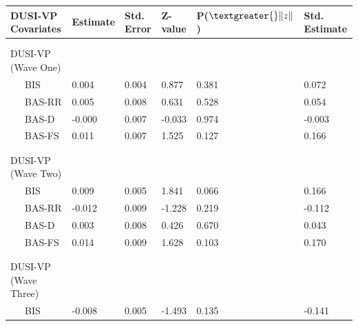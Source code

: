 \documentclass[utf8]{article}
\begin{document}
\begin{table}[h!]
\begin{tabular}{llllll}
DUSI-VP Covariates                    & Estimate & Std. Error & Z-value & P($\textgreater{}\|z\|$) & Std. Estimate \\ \hline \\
                               &          &            &         &                          &         \\
DUSI-VP (Wave One)             &          &            &         &                          &         \\
\ \ \ BIS                            & 0.004    & 0.004      & 0.877   & 0.381                    & 0.072   \\
\ \ \ BAS-RR                         & 0.005    & 0.008      & 0.631   & 0.528                    & 0.054   \\
\ \ \ BAS-D                          & -0.000   & 0.007      & -0.033  & 0.974                    & -0.003  \\
\ \ \ BAS-FS                         & 0.011    & 0.007      & 1.525   & 0.127                    & 0.166   \\
                               &          &            &         &                          &         \\ \hline \\ 
DUSI-VP (Wave Two)             &     &     &   &                          &         \\
\ \ \ BIS                            & 0.009    & 0.005      & 1.841   & 0.066                    & 0.166   \\
\ \ \ BAS-RR                         & -0.012   & 0.009      & -1.228  & 0.219                    & -0.112  \\
\ \ \ BAS-D                          & 0.003    & 0.008      & 0.426   & 0.670                    & 0.043   \\
\ \ \ BAS-FS                         & 0.014    & 0.009      & 1.628   & 0.103                    & 0.170   \\ \\ \hline 
                               &          &            &         &                          &         \\
DUSI-VP (Wave Three)           &          &            &         &                          &         \\
\ \ \ BIS                            & -0.008   & 0.005      & -1.493  & 0.135                    & -0.141  \\

\end{tabular}
\end{table}
\end{document}
